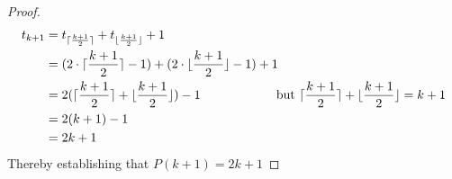\documentclass[10pt]{exam}
\begin{document}
\begin{parts}
\begin{customsolutionbox}
\begin{proof}
            \begin{align*}
                t_{k+1} &= t_{\lceil\frac{k+1}{2}\rceil} + t_{\lfloor\frac{k+1}{2}\rfloor} + 1 \\
                        &= (2 \cdot \lceil\frac{k+1}{2}\rceil - 1) + (2 \cdot \lfloor\frac{k+1}{2}\rfloor - 1) + 1 \\
                        & = 2 (\lceil\frac{k+1}{2}\rceil + \lfloor\frac{k+1}{2}\rfloor) - 1    \hspace{20mm} \text{ but } \lceil\frac{k+1}{2}\rceil + \lfloor\frac{k+1}{2}\rfloor = k + 1 \\
                        &= 2(k+1) - 1 \\
                        &= 2k + 1
            \end{align*}
            Thereby establishing that $P(k+1) = 2k + 1$

        \end{proof}
    \end{customsolutionbox}

\end{parts}
\end{document}
